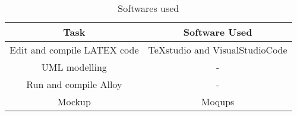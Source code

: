 \begin{flushleft}

\begin{table}[htp]
	\centering

\begin{tabular}{|c|c|}
\hline
Task&Software Used\\
\hline
Edit and compile LATEX code&TeXstudio and VisualStudioCode\\
\hline
UML modelling&-\\
\hline
Run and compile Alloy&-\\
\hline
Mockup&Moqups\\
\hline

\end{tabular}

\caption{Softwares used} 

\end{table}

\end{flushleft}